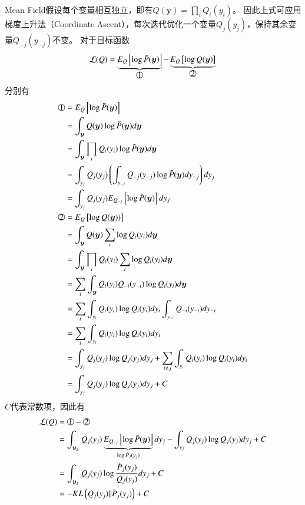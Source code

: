 Mean Field假设每个变量相互独立，即有$Q(\boldsymbol{y})=\prod_i{Q_i(y_i)}$。
因此上式可应用梯度上升法（Coordinate Ascent），每次迭代优化一个变量$Q_j(y_j)$，保持其余变量$Q_{-j}(y_{-j})$不变。
对于目标函数
\begin{equation}
	\mathcal{L}(Q)=\underbrace{E_{Q}\left[\log \tilde{P}(\boldsymbol{y})\right]}_{\tcircle{1}}-\underbrace{E_{Q}\left[\log Q(\boldsymbol{y})\right]}_{\tcircle{2}}
\end{equation}
分别有
\begin{equation}
	\begin{split}
		\tcircle{1}&=E_{Q}\left[\log \tilde{P}(\boldsymbol{y})\right]\\
		&=\int_{\boldsymbol{y}}Q(\boldsymbol{y}) \log \tilde{P}(\boldsymbol{y})d\boldsymbol{y}\\
		&=\int_{\boldsymbol{y}}\prod_i{Q_i(y_i)} \log \tilde{P}(\boldsymbol{y})d\boldsymbol{y}\\
		&=\int_{y_j}Q_j(y_j)\left(\int_{y_{-j}}Q_{-j}(y_{-j})\log \tilde{P}(\boldsymbol{y}) dy_{-j}\right) dy_j\\
		&=\int_{y_j}Q_j(y_j)E_{Q_{-j}}\left[\log \tilde{P}(\boldsymbol{y}) \right] dy_j\\
		\tcircle{2}&=E_{Q}\left[\log Q(\boldsymbol{y}))\right]\\
		&=\int_{\boldsymbol{y}}Q(\boldsymbol{y}) \sum_i\log Q_i(y_i) d\boldsymbol{y}\\
		&=\int_{\boldsymbol{y}}\prod_i{Q_i(y_i)} \sum_i\log Q_i(y_i) d\boldsymbol{y}\\
		&=\sum_i\int_{\boldsymbol{y}}Q_i(y_i)Q_{-i}(y_{-i})\log Q_i(y_i) d\boldsymbol{y}\\
		&=\sum_i\int_{y_i}Q_i(y_i)\log Q_i(y_i) dy_i\int_{y_{-i}} {Q_{-i}(y_{-i})}dy_{-i}\\
		&=\sum_i\int_{y_i}Q_i(y_i)\log Q_i(y_i) dy_i\\
		&=\int_{y_j}Q_j(y_j)\log Q_j(y_j) dy_j + \sum_{i\neq j}\int_{y_i}Q_i(y_i)\log Q_i(y_i) dy_i  \\
		&=\int_{y_j}Q_j(y_j)\log Q_j(y_j) dy_j + C
	\end{split}
\end{equation}
$C$代表常数项，因此有
\begin{equation}
	\begin{split}
		\mathcal{L}(Q)&=\tcircle{1}-\tcircle{2}\\
		&=\int_{\boldsymbol{y_j}}Q_j(y_j)\underbrace{E_{Q_{-j}}\left[\log \tilde{P}(\boldsymbol{y}) \right]}_{\log \dot{P}_j(y_j)} dy_j-\int_{y_j}Q_j(y_j)\log Q_j(y_j) dy_j +C\\
		&=\int_{\boldsymbol{y_j}}Q_j(y_j)\log\frac{\dot{P}_j(y_j)}{Q_j(y_j)} dy_j +C\\
		&=-KL\left(Q_j(y_j)\|\dot{P}_j(y_j)\right)+C
	\end{split}
\end{equation}
